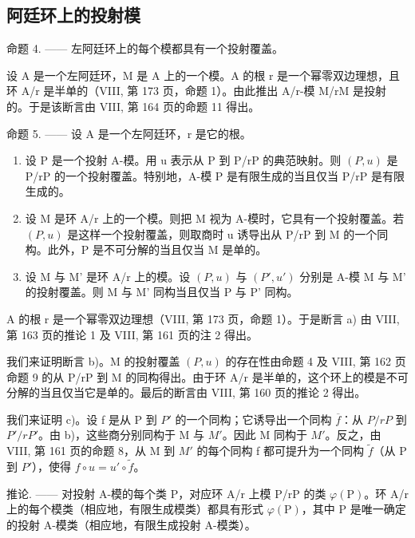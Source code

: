 \subsection{阿廷环上的投射模}

命题 4. —— 左阿廷环上的每个模都具有一个投射覆盖。

设 A 是一个左阿廷环，M 是 A 上的一个模。A 的根 r 是一个幂零双边理想，且环 A/r 是半单的（VIII, 第 173 页，命题 1）。由此推出 A/r-模 M/rM 是投射的。于是该断言由 VIII, 第 164 页的命题 11 得出。

命题 5. —— 设 A 是一个左阿廷环，r 是它的根。

\begin{enumerate}
\def\labelenumi{\alph{enumi})}
\item
  设 P 是一个投射 A-模。用 u 表示从 P 到 P/rP 的典范映射。则 \((P,u)\) 是 P/rP 的一个投射覆盖。特别地，A-模 P 是有限生成的当且仅当 P/rP 是有限生成的。
\item
  设 M 是环 A/r 上的一个模。则把 M 视为 A-模时，它具有一个投射覆盖。若 \((P,u)\) 是这样一个投射覆盖，则取商时 u 诱导出从 P/rP 到 M 的一个同构。此外，P 是不可分解的当且仅当 M 是单的。
\item
  设 M 与 M' 是环 A/r 上的模。设 \((P, u)\) 与 \((P', u')\) 分别是 A-模 M 与 M' 的投射覆盖。则 M 与 M' 同构当且仅当 P 与 P' 同构。
\end{enumerate}

A 的根 r 是一个幂零双边理想（VIII, 第 173 页，命题 1）。于是断言 a) 由 VIII, 第 163 页的推论 1 及 VIII, 第 161 页的注 2 得出。

我们来证明断言 b)。M 的投射覆盖 \((P, u)\) 的存在性由命题 4 及 VIII, 第 162 页命题 9 的从 P/rP 到 M 的同构得出。由于环 A/r 是半单的，这个环上的模是不可分解的当且仅当它是单的。最后的断言由 VIII, 第 160 页的推论 2 得出。

我们来证明 c)。设 f 是从 P 到 \(P'\) 的一个同构；它诱导出一个同构 \(\overline{f}\)：从 \(P/rP\) 到 \(P'/rP'\)。由 b)，这些商分别同构于 M 与 \(M'\)。因此 M 同构于 \(M'\)。反之，由 VIII, 第 161 页的命题 8，从 M 到 \(M'\) 的每个同构 f 都可提升为一个同构 \(\widetilde{f}\)（从 P 到 \(P'\)），使得 \(f \circ u = u' \circ \widetilde{f}\)。

推论. —— 对投射 A-模的每个类 P，对应环 A/r 上模 P/rP 的类 \(\varphi(\mathrm{P})\)。环 A/r 上的每个模类（相应地，有限生成模类）都具有形式 \(\varphi(\mathrm{P})\)，其中 P 是唯一确定的投射 A-模类（相应地，有限生成投射 A-模类）。

